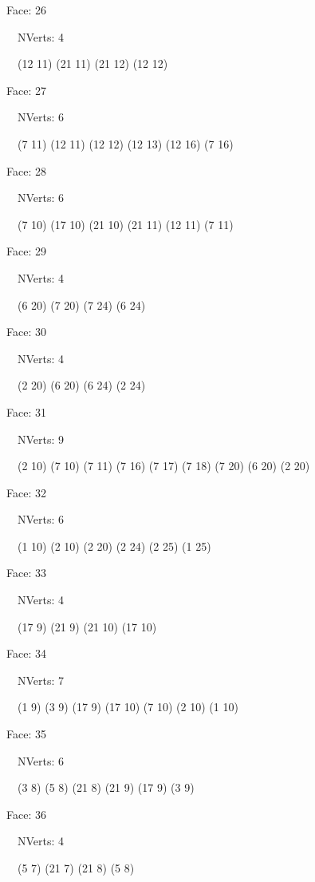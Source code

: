 \documentclass{article}
\begin{document}
{\footnotesize 

Face: 26

\   \    NVerts: 4

 \   \   (12 11) (21 11) (21 12) (12 12)}

{\footnotesize 

Face: 27

\   \    NVerts: 6

 \   \   (7 11) (12 11) (12 12) (12 13) (12 16) (7 16)}

{\footnotesize 

Face: 28

\   \    NVerts: 6

 \   \   (7 10) (17 10) (21 10) (21 11) (12 11) (7 11)}

{\footnotesize 

Face: 29

\   \    NVerts: 4

 \   \   (6 20) (7 20) (7 24) (6 24)}

{\footnotesize 

Face: 30

\   \    NVerts: 4

 \   \   (2 20) (6 20) (6 24) (2 24)}

{\footnotesize 

Face: 31

\   \    NVerts: 9

 \   \   (2 10) (7 10) (7 11) (7 16) (7 17) (7 18) (7 20) (6 20) (2 20)}

{\footnotesize 

Face: 32

\   \    NVerts: 6

 \   \   (1 10) (2 10) (2 20) (2 24) (2 25) (1 25)}

{\footnotesize 

Face: 33

\   \    NVerts: 4

 \   \   (17 9) (21 9) (21 10) (17 10)}

{\footnotesize 

Face: 34

\   \    NVerts: 7

 \   \   (1 9) (3 9) (17 9) (17 10) (7 10) (2 10) (1 10)}

{\footnotesize 

Face: 35

\   \    NVerts: 6

 \   \   (3 8) (5 8) (21 8) (21 9) (17 9) (3 9)}

{\footnotesize 

Face: 36

\   \    NVerts: 4

 \   \   (5 7) (21 7) (21 8) (5 8)}
\end{document}
